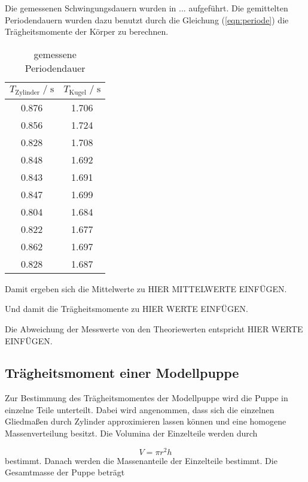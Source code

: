 Die gemessenen Schwingungsdauern wurden in $...$ aufgeführt. Die gemittelten Periodendauern wurden dazu benutzt
durch die Gleichung (\autoref{eqn:periode}) die Trägheitsmomente der Körper zu berechnen.

\begin{table}
  \centering
   \caption{gemessene Periodendauer}
   \label{tab:traegheitsmomente}
   \begin{tabular}{c c}
      \toprule
      $ T_{\text{Zylinder}} \;/\; \si{\second}$ & $ T_{\text{Kugel}} \;/\; \si{\second}$ \\
      \midrule
      0.876 & 1.706 \\
      0.856 & 1.724 \\
      0.828 & 1.708 \\
      0.848 & 1.692 \\
      0.843 & 1.691 \\
      0.847 & 1.699 \\
      0.804 & 1.684 \\
      0.822 & 1.677 \\
      0.862 & 1.697 \\
      0.828 & 1.687 \\
      \bottomrule
   \end{tabular}
\end{table}

Damit ergeben sich die Mittelwerte zu HIER MITTELWERTE EINFÜGEN.

Und damit die Trägheitsmomente zu HIER WERTE EINFÜGEN.

Die Abweichung der Messwerte von den Theoriewerten entspricht HIER WERTE EINFÜGEN.

\subsection{Trägheitsmoment einer Modellpuppe}
\label{sec:Trägheitsmoment einer Modellpuppe}

Zur Bestimmung des Trägheitsmomentes der Modellpuppe wird die Puppe in einzelne Teile unterteilt. Dabei wird angenommen,
dass sich die einzelnen Gliedmaßen durch Zylinder approximieren lassen können und eine homogene Massenverteilung besitzt. Die
Volumina der Einzelteile werden durch

\begin{equation}
  V = \pi r^2h
\end{equation}
bestimmt. Danach werden die Massenanteile der Einzelteile bestimmt. Die Gesamtmasse der Puppe beträgt 

